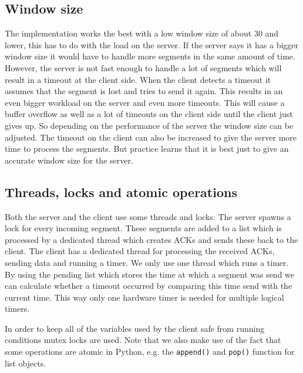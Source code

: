 \documentclass[a4paper]{article}
\begin{document}
	\subsection{Window size}\label{sec: window size}
	The implementation works the best with a low window size of about 30 and lower, this has to do with the load on the server. If the server says it has a bigger window size it would have to handle more segments in the same amount of time. However, the server is not fast enough to handle a lot of segments which will result in a timeout at the client side. When the client detects a timeout it assumes that the segment is lost and tries to send it again. This results in an even bigger workload on the server and even more timeouts. This will cause a buffer overflow as well as a lot of timeouts on the client side until the client just gives up. So depending on the performance of the server the window size can be adjusted. The timeout on the client can also be increased to give the server more time to process the segments. But practice learns that it is best just to give an accurate window size for the server.

	\subsection{Threads, locks and atomic operations}
	Both the server and the client use some threads and locks. The server spawns a lock for every incoming segment. These segments are added to a list which is processed by a dedicated thread which creates ACKs and sends these back to the client. The client has a dedicated thread for processing the received ACKs, sending data and running a timer. We only use one thread which runs a timer. By using the pending list which stores the time at which a segment was send we can calculate whether a timeout occurred by comparing this time send with the current time. This way only one hardware timer is needed for multiple logical timers.

	In order to keep all of the variables used by the client safe from running conditions mutex locks are used. Note that we also make use of the fact that some operations are atomic in Python, e.g. the \texttt{append()} and \texttt{pop()} function for list objects.
\end{document}
